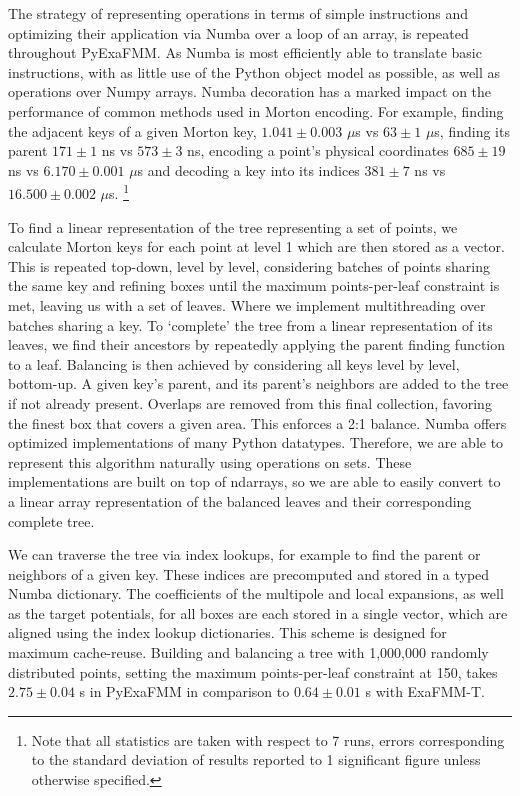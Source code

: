 \documentclass{IEEEcsmag}
\begin{document}
The strategy of representing operations in terms of simple instructions and optimizing their application via Numba over a loop of an array, is repeated throughout PyExaFMM. As Numba is most efficiently able to translate basic instructions, with as little use of the Python object model as possible, as well as operations over Numpy arrays. Numba decoration has a marked impact on the performance of common methods used in Morton encoding. For example, finding the adjacent keys of a given Morton key, $1.041 \pm 0.003$ $\mu$s vs  $63 \pm 1$ $\mu$s, finding its parent $171 \pm 1$ ns vs $573 \pm 3$ ns, encoding a point's physical coordinates $685 \pm 19$ ns vs $6.170 \pm 0.001$ $\mu$s and decoding a key into its indices $381 \pm 7$ ns vs $16.500 \pm 0.002$ $\mu$s. \footnote[3]{Note that all statistics are taken with respect to 7 runs, errors corresponding to the standard deviation of results reported to 1 significant figure unless otherwise specified.}

To find a linear representation of the tree representing a set of points, we calculate Morton keys for each point at level 1 which are then stored as a vector. This is repeated top-down, level by level, considering batches of points sharing the same key and refining boxes until the maximum points-per-leaf constraint is met, leaving us with a set of leaves. Where we implement multithreading over batches sharing a key. To `complete' the tree from a linear representation of its leaves, we find their ancestors by repeatedly applying the parent finding function to a leaf. Balancing is then achieved by considering all keys level by level, bottom-up. A given key's parent, and its parent's neighbors are added to the tree if not already present. Overlaps are removed from this final collection, favoring the finest box that covers a given area. This enforces a 2:1 balance. Numba offers optimized implementations of many Python datatypes. Therefore, we are able to represent this algorithm naturally using operations on sets. These implementations are built on top of ndarrays, so we are able to easily convert to a linear array representation of the balanced leaves and their corresponding complete tree.

We can traverse the tree via index lookups, for example to find the parent or neighbors of a given key. These indices are precomputed and stored in a typed Numba dictionary. The coefficients of the multipole and local expansions, as well as the target potentials, for all boxes are each stored in a single vector, which are aligned using the index lookup dictionaries. This scheme is designed for maximum cache-reuse.
Building and balancing a tree with 1,000,000 randomly distributed points, setting the maximum points-per-leaf constraint at 150, takes $2.75 \pm 0.04$ s in PyExaFMM in comparison to $0.64 \pm 0.01$ s with ExaFMM-T.
\end{document}

